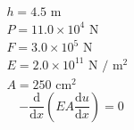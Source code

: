 \documentclass[a4paper]{article}
\begin{document}
\[
  \begin{array}{l}
  h = 4.5\text{ m }\\
  P = 11.0\times 10^{4}\text{ N }\\
  F = 3.0\times 10^{5}\text{ N }\\
  E = 2.0\times 10^{11}\text{ N / m$^{2}$ }\\
  A = 250\text{ cm$^{2}$ }
  \end{array}
\]
\[
  -\dfrac{\mathrm{d}}{\mathrm{d} x}\left(EA\dfrac{\mathrm{d} u}{\mathrm{d}
    x}\right) = 0
  \]
\end{document}
